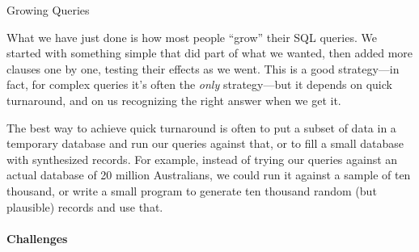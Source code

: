 \documentclass{book}
\begin{document}
\begin{swcbox}{Growing Queries}

What we have just done is how most people ``grow'' their SQL queries. We
started with something simple that did part of what we wanted, then
added more clauses one by one, testing their effects as we went. This is
a good strategy---in fact, for complex queries it's often the
\emph{only} strategy---but it depends on quick turnaround, and on us
recognizing the right answer when we get it.

The best way to achieve quick turnaround is often to put a subset of
data in a temporary database and run our queries against that, or to
fill a small database with synthesized records. For example, instead of
trying our queries against an actual database of 20 million Australians,
we could run it against a sample of ten thousand, or write a small
program to generate ten thousand random (but plausible) records and use
that.

\end{swcbox}

\mbox{}\paragraph{Challenges}
\end{document}
